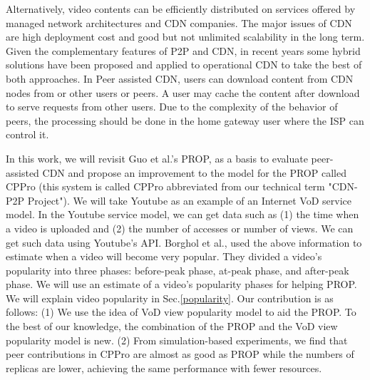 \documentclass[10pt,final,journal,a4paper]{IEEEtran}
\begin{document}
Alternatively, video contents can be efficiently distributed on services offered by managed network architectures and CDN companies.
The major issues of CDN are high deployment cost and good but not unlimited scalability in the long term.  
Given the complementary features of P2P and CDN, in recent years some hybrid solutions have been proposed and applied to  operational  CDN \cite{Huang:2008:UHC:1496046.1496064,4772628,Yin:2009:DDH:1631272.1631279} to take the best of both approaches.
In Peer assisted CDN, users can download content from CDN nodes from or other users or peers. 
A user may cache the content after download to serve requests from other users. 
Due to the complexity of the behavior of peers, the processing should be done in the home gateway user where the ISP can control it.

In this work, we will revisit Guo et al.'s PROP, \cite{1613869} as a basis to evaluate peer-assisted CDN and propose an improvement to the model for the PROP called CPPro (this system is called CPPro abbreviated from our technical term "CDN-P2P Project").
We will take Youtube as an example of an Internet VoD service model.
In the Youtube service model, we can get data such as (1) the time when a video is uploaded and (2) the number of accesses or number of views.
We can get such data using Youtube's API.
Borghol et al., \cite{Borghol:2011:CMP:2039452.2039717} used the above information to estimate when a video will become very popular.
They divided a video's popularity into three phases: before-peak phase, at-peak phase, and after-peak phase.
We will use an estimate of a video's popularity phases for helping PROP.
We will explain video popularity in Sec.\ref{popularity}.
Our contribution is as follows:
(1) We use the idea of VoD view popularity model to aid the PROP. 
To the best of our knowledge, the combination of the PROP and the VoD view popularity model is new.
(2) From simulation-based experiments, we find that peer contributions in CPPro are almost as good as  PROP while the numbers of replicas are lower, achieving the same performance with fewer resources.
\end{document}

